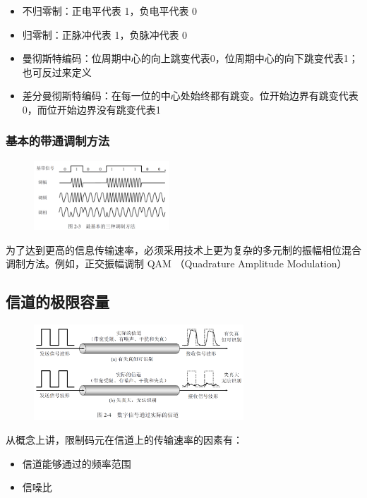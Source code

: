 \documentclass[cs4size,a4paper,10pt]{ctexart}
\begin{document}
	\begin{itemize}
		\item 不归零制：正电平代表 1，负电平代表 0
		\item 归零制：正脉冲代表 1，负脉冲代表 0
		\item 曼彻斯特编码：位周期中心的向上跳变代表0，位周期中心的向下跳变代表1；也可反过来定义
		\item 差分曼彻斯特编码：在每一位的中心处始终都有跳变。位开始边界有跳变代表0，而位开始边界没有跳变代表1
	\end{itemize}

	\subsubsection{基本的带通调制方法}

	\begin{figure}[H]
		\centering
		\includegraphics[width=0.45\textwidth]{img/2.3}
	\end{figure}
	为了达到更高的信息传输速率，必须采用技术上更为复杂的多元制的振幅相位混合调制方法。例如，正交振幅调制 QAM （Quadrature Amplitude Modulation）

	\subsection{信道的极限容量}
	\begin{figure}[H]
		\centering
		\includegraphics[width=0.7\textwidth]{img/2.4}
	\end{figure}
	从概念上讲，限制码元在信道上的传输速率的因素有：
	\begin{itemize}
		\item 信道能够通过的频率范围
		\item 信噪比
	\end{itemize}
\end{document}
